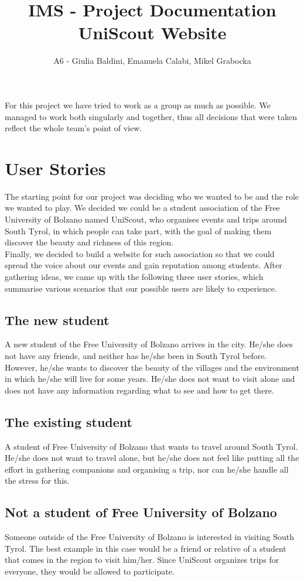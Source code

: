 \documentclass[a4paper]{article}
\title{IMS - Project Documentation\\UniScout Website}
\author{A6 - Giulia Baldini, Emanuela Calabi, Mikel Grabocka}
\begin{document}
	\maketitle
	
	\noindent For this project we have tried to work as a group as much as possible. We managed to work both singularly and together, thus all decisions that were taken reflect the whole team's point of view.
	
	\section{User Stories}
	The starting point for our project was deciding who we wanted to be and the role we wanted to play. We decided we could be a student association of the Free University of Bolzano named UniScout, who organises events and trips around South Tyrol, in which people can take part, with the goal of making them discover the beauty and richness of this region.\\
	Finally, we decided to build a website for such association so that we could spread the voice about our events and gain reputation among students. After gathering ideas, we came up with the following three user stories, which summarise various scenarios that our possible users are likely to experience.
	
	\subsection{The new student}
	A new student of the Free University of Bolzano arrives in the city. He/she does not have any friends, and neither has he/she been in South Tyrol before. However, he/she wants to discover the beauty of the villages and the environment in which he/she will live for some years. He/she does not want to visit alone and does not have any information regarding what to see and how to get there.
	
	\subsection{The existing student }
	A student of Free University of Bolzano that wants to travel around South Tyrol. He/she does not want to travel alone, but he/she does not feel like putting all the effort in gathering companions and organising a trip, nor can he/she handle all the stress for this.
	
	\subsection{Not a student of Free University of Bolzano}
	Someone outside of the Free University of Bolzano is interested in visiting South Tyrol. The best example in this case would be a friend or relative of a student that comes in the region to visit him/her. Since UniScout organizes trips for everyone, they would be allowed to participate.
	
\end{document}
